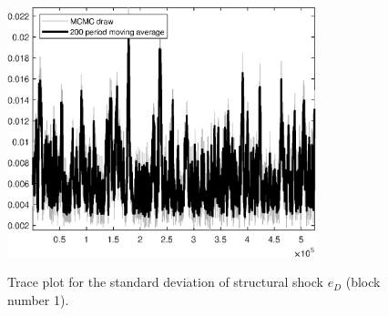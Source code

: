 \begin{figure}[H]
\centering
  \includegraphics[width=0.8\textwidth]{BRS_growth_KPR/graphs/TracePlot_SE_e_D_blck_1}\\
    \caption{Trace plot for the standard deviation of structural shock ${e_D}$ (block number 1).}
\end{figure}
